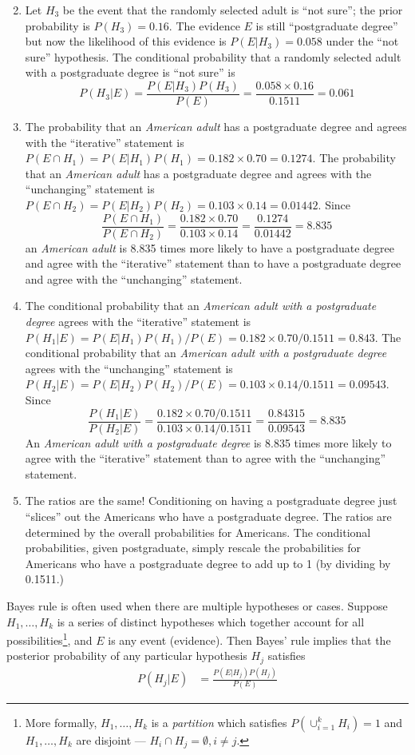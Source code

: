 \documentclass[
]{book}
\theoremstyle{definition}
\theoremstyle{definition}
\theoremstyle{definition}
\theoremstyle{remark}
\begin{document}
\begin{enumerate}
\[   \]
\item
  Let \(H_3\) be the event that the randomly selected adult is ``not sure''; the prior probability is \(P(H_3) = 0.16\). The evidence \(E\) is still ``postgraduate degree'' but now the likelihood of this evidence is \(P(E | H_3) = 0.058\) under the ``not sure'' hypothesis. The conditional probability that a randomly selected adult with a postgraduate degree is ``not sure'' is
  \[
   P(H_3 | E) = \frac{P(E | H_3) P(H_3)}{P(E)} = \frac{0.058 \times 0.16}{0.1511} = 0.061
   \]
\item
  The probability that an \emph{American adult} has a postgraduate degree and agrees with the ``iterative'' statement is \(P(E \cap H_1) = P(E|H_1)P(H_1) = 0.182\times 0.70 = 0.1274\). The probability that an \emph{American adult} has a postgraduate degree and agrees with the ``unchanging'' statement is \(P(E \cap H_2) = P(E|H_2)P(H_2) = 0.103\times 0.14 = 0.01442\). Since
  \[
     \frac{P(E \cap H_1)}{P(E \cap H_2)} = \frac{0.182\times 0.70}{0.103\times 0.14} = \frac{0.1274}{0.01442} = 8.835
   \]
  an \emph{American adult} is 8.835 times more likely to have a postgraduate degree and agree with the ``iterative'' statement than to have a postgraduate degree and agree with the ``unchanging'' statement.
\item
  The conditional probability that an \emph{American adult with a postgraduate degree} agrees with the ``iterative'' statement is \(P(H_1 | E) = P(E|H_1)P(H_1)/P(E) = 0.182\times 0.70/0.1511 = 0.843\). The conditional probability that an \emph{American adult with a postgraduate degree} agrees with the ``unchanging'' statement is \(P(H_2|E) = P(E|H_2)P(H_2)/P(E) = 0.103\times 0.14/0.1511 = 0.09543\). Since
  \[
     \frac{P(H_1 | E)}{P(H_2 | E)} = \frac{0.182\times 0.70/0.1511}{0.103\times 0.14/0.1511} = \frac{0.84315}{0.09543} = 8.835
   \]
  An \emph{American adult with a postgraduate degree} is 8.835 times more likely to agree with the ``iterative'' statement than to agree with the ``unchanging'' statement.
\item
  The ratios are the same! Conditioning on having a postgraduate degree just ``slices'' out the Americans who have a postgraduate degree. The ratios are determined by the overall probabilities for Americans. The conditional probabilities, given postgraduate, simply rescale the probabilities for Americans who have a postgraduate degree to add up to 1 (by dividing by 0.1511.)
\end{enumerate}

Bayes rule is often used when there are multiple hypotheses or cases. Suppose \(H_1,\ldots, H_k\) is a series of distinct hypotheses which together account for all possibilities\footnote{More formally, \(H_1,\ldots, H_k\) is a \emph{partition} which satisfies \(P\left(\cup_{i=1}^k H_i\right)=1\) and \(H_1, \ldots, H_k\) are disjoint --- \(H_i\cap H_j=\emptyset , i\neq j\).}, and \(E\) is any event (evidence). Then Bayes' rule implies that the posterior probability of any particular hypothesis \(H_j\) satisfies
\begin{align*}
P(H_j |E) & = \frac{P(E|H_j)P(H_j)}{P(E)}
\end{align*}
\end{document}
